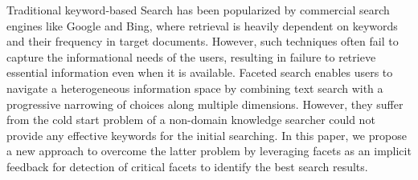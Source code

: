Traditional keyword-based Search has been popularized by commercial search engines like Google and Bing, where retrieval is heavily dependent on keywords and their frequency in target documents. However, such techniques often fail to capture the informational needs of the users, resulting in failure to retrieve essential information even when it is available. Faceted search enables users to navigate a heterogeneous information space by combining text search with a progressive narrowing of choices along multiple dimensions. However, they suffer from the cold start problem of a non-domain knowledge searcher could not provide any effective keywords for the initial searching. In this paper, we propose a new approach to overcome the latter problem by leveraging facets as an implicit feedback for detection of critical facets to identify the best search results.

